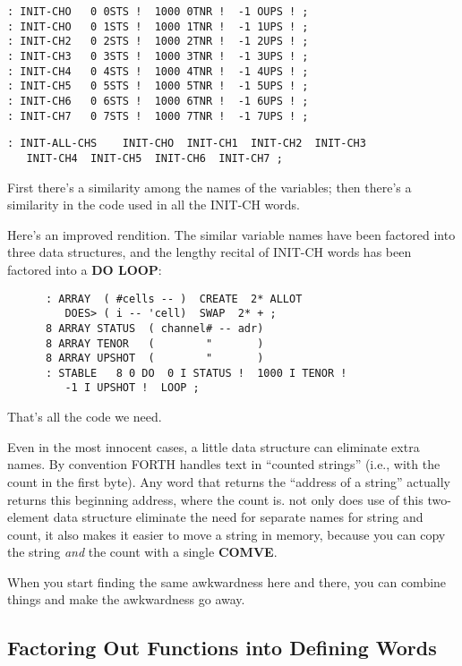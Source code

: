 \begin{verbatim} 
: INIT-CHO   0 0STS !  1000 0TNR !  -1 OUPS ! ; 
: INIT-CHO   0 1STS !  1000 1TNR !  -1 1UPS ! ; 
: INIT-CH2   0 2STS !  1000 2TNR !  -1 2UPS ! ; 
: INIT-CH3   0 3STS !  1000 3TNR !  -1 3UPS ! ; 
: INIT-CH4   0 4STS !  1000 4TNR !  -1 4UPS ! ; 
: INIT-CH5   0 5STS !  1000 5TNR !  -1 5UPS ! ; 
: INIT-CH6   0 6STS !  1000 6TNR !  -1 6UPS ! ; 
: INIT-CH7   0 7STS !  1000 7TNR !  -1 7UPS ! ; 
\end{verbatim}

\begin{verbatim} 
: INIT-ALL-CHS    INIT-CHO  INIT-CH1  INIT-CH2  INIT-CH3
   INIT-CH4  INIT-CH5  INIT-CH6  INIT-CH7 ;
\end{verbatim}
First there's a similarity among the names of the variables; then there's a similarity in the code used in all the INIT-CH words.

Here's an improved rendition. The similar variable names have been factored into three data structures, and the lengthy recital of INIT-CH words has been factored into a \textbf{DO LOOP}:

\begin{verbatim}
      : ARRAY  ( #cells -- )  CREATE  2* ALLOT
         DOES> ( i -- 'cell)  SWAP  2* + ; 
      8 ARRAY STATUS  ( channel# -- adr)
      8 ARRAY TENOR   (        "       )
      8 ARRAY UPSHOT  (        "       )
      : STABLE   8 0 DO  0 I STATUS !  1000 I TENOR ! 
         -1 I UPSHOT !  LOOP ;
\end{verbatim}

\noindent That's all the code we need.

Even in the most innocent cases, a little data structure can eliminate extra names. By convention FORTH handles text in ``counted strings'' (i.e., with the count in the first byte). Any word that returns the ``address of a string'' actually returns this beginning address, where the count is. not only does use of this two-element data structure eliminate the need for separate names for string and count, it also makes it easier to move a string in memory, because you can copy the string \emph{and} the count
with a single \textbf{COMVE}.

When you start finding the same awkwardness here and there, you can combine things and make the awkwardness go away.

\subsection{{Factoring Out Functions into Defining Words}}

